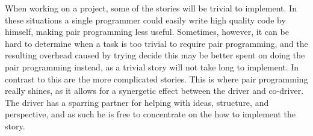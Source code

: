 When working on a project, some of the stories will be trivial to implement.
In these situations a single programmer could easily write high quality code by himself, making pair programming less useful.
Sometimes, however, it can be hard to determine when a task is too trivial to require pair programming, and the resulting overhead caused by trying decide this may be better spent on doing the pair programming instead, as a trivial story will not take long to implement.
In contrast to this are the more complicated stories.
This is where pair programming really shines, as it allows for a synergetic effect between the driver and co-driver.
The driver has a sparring partner for helping with ideas, structure, and perspective, and as such he is free to concentrate on the how to implement the story.






